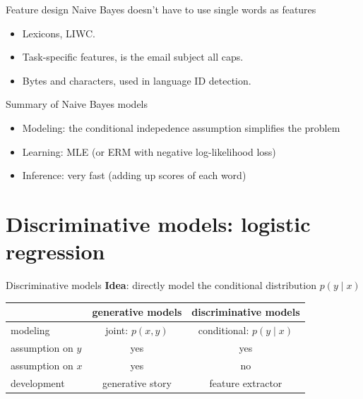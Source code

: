 \documentclass[usenames,dvipsnames,notes,11pt,aspectratio=169]{beamer}
\newcommand{\pdfnote}[1]{}
\begin{document}
\begin{frame}
    {Feature design}
        Naive Bayes doesn't have to use single words as features
    \begin{itemize}
        \itemsep1em
        \item Lexicons, \eg LIWC.
        \item Task-specific features, \eg is the email subject all caps.
        \item Bytes and characters, \eg used in language ID detection.
    \end{itemize}
    \pdfnote{
        Char/byte NB model is a very fast and effective language ID detector (e.g., google translate).
    }
\end{frame}

\begin{frame}
    {Summary of Naive Bayes models}
    \begin{itemize}
        \item Modeling: the conditional indepedence assumption simplifies the problem
        \item Learning: MLE (or ERM with negative log-likelihood loss)
        \item Inference: very fast (adding up scores of each word)
    \end{itemize}
\end{frame}

\section{Discriminative models: logistic regression}

\begin{frame}
    {Discriminative models}
    \textbf{Idea}: directly model the conditional distribution $p(y\mid x)$
    \pause
    \begin{table}
        \renewcommand{\arraystretch}{1.5}
        \begin{tabular}{lcc}
            & generative models & discriminative models \\
            \hline
            modeling & joint: $p(x,y)$ & conditional: $p(y\mid x)$ \\
            assumption on $y$ & yes & yes \\
            assumption on $x$ & yes & no \\
            development & generative story & feature extractor
        \end{tabular}
    \end{table}
    \pdfnote{
        In Naive Bayes model, we used Bayes rule to get $p(y\mid x)$ given $p(x\mid y)$ and the class prior $p(y)$.
        But one question here is, if $p(y\mid x)$ is what we are ultimately interested in, why bother modeling the data likelihood and the prior as opposed to directly modeling $p(y\mid x)$.
    }
\end{frame}
\end{document}
